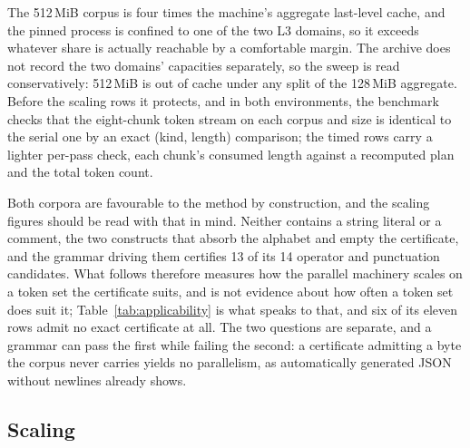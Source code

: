 \documentclass[11pt,a4paper]{article}
\theoremstyle{definition}
\theoremstyle{plain}
\begin{document}
The 512\,MiB corpus is four times the machine's aggregate last-level cache, and the pinned process is confined to one of
the two L3 domains, so it exceeds whatever share is actually reachable by a comfortable margin. The archive does not
record the two domains' capacities separately, so the sweep is read conservatively: 512\,MiB is out of cache under any
split of the 128\,MiB aggregate. Before the scaling rows it protects, and in both environments, the benchmark checks
that the eight-chunk token stream on each corpus and size is identical to the serial one by an exact (kind, length)
comparison; the timed rows carry a lighter per-pass check, each chunk's consumed length against a recomputed plan and
the total token count.

Both corpora are favourable to the method by construction, and the scaling figures should be read with that in mind.
Neither contains a string literal or a comment, the two constructs that absorb the alphabet and empty the certificate,
and the grammar driving them certifies 13 of its 14 operator and punctuation candidates. What follows therefore
measures how the parallel machinery scales on a token set the certificate suits, and is not evidence about how often a
token set does suit it; Table~\ref{tab:applicability} is what speaks to that, and six of its eleven rows admit no
exact certificate at all. The two questions are separate, and a grammar can pass the first while failing the second: a
certificate admitting a byte the corpus never carries yields no parallelism, as automatically generated JSON without
newlines already shows.

\subsection{Scaling}
\end{document}
